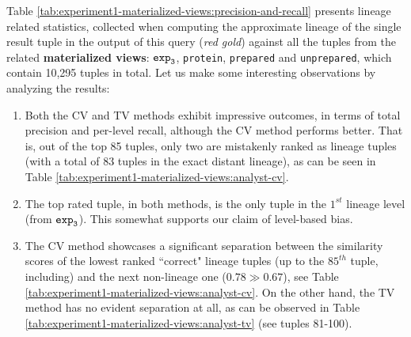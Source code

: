 \begin{experiment-withrun}


Table \ref{tab:experiment1-materialized-views:precision-and-recall} presents lineage related statistics, collected when computing the approximate lineage of the single result tuple in the output of this query (\textit{red gold}) against all the tuples from the related \textbf{materialized views}: $\texttt{exp}\sb\texttt{3}$, \texttt{protein}, \texttt{prepared} and \texttt{unprepared}, which contain 10,295 tuples in total. Let us make some interesting observations by analyzing the results:
\begin{enumerate}
    \item Both the CV and TV methods exhibit impressive outcomes, in terms of total precision and per-level recall, although the CV method performs better. That is, out of the top 85 tuples, only two are mistakenly ranked as lineage tuples (with a total of 83 tuples in the exact distant lineage), as can be seen in Table \ref{tab:experiment1-materialized-views:analyst-cv}.
    \item The top rated tuple, in both methods, is the only tuple in the $1^{st}$ lineage level (from $\texttt{exp}\sb\texttt{3}$). This somewhat supports our claim of level-based bias.
    \item The CV method showcases a significant separation between the similarity scores of the lowest ranked ``correct" lineage tuples (up to the $85^{th}$ tuple, including) and the next non-lineage one ($0.78 \gg 0.67$), see Table \ref{tab:experiment1-materialized-views:analyst-cv}. On the other hand, the TV method has no evident separation at all, as can be observed in Table \ref{tab:experiment1-materialized-views:analyst-tv} (see tuples 81-100).
\end{enumerate}






\end{experiment-withrun}


